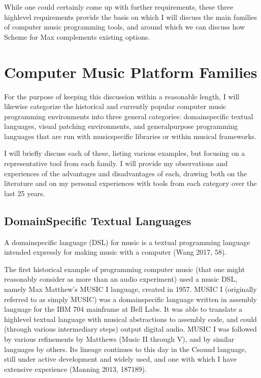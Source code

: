 \documentclass[letterpaper,10pt,english]{sphinxmanual}
\begin{document}
\sphinxAtStartPar
While one could certainly come up with further requirements, these three high\sphinxhyphen{}level
requirements provide the basis
on which I will discuss the main families of computer music programming tools, and
around which we can discuss how Scheme for Max complements existing options.


\section{Computer Music Platform Families}
\label{\detokenize{background:computer-music-platform-families}}
\sphinxAtStartPar
For the purpose of keeping this discussion within a reasonable length,
I will likewise categorize the historical and currently popular computer music programming
environments into three general categories: domain\sphinxhyphen{}specific textual languages, visual patching
environments, and general\sphinxhyphen{}purpose programming languages that are run with music\sphinxhyphen{}specific libraries
or within musical frameworks.

\sphinxAtStartPar
I will briefly discuss each of these, listing various examples, but focusing on a representative tool from each family.
I will provide my observations and experiences of the advantages and disadvantages of each,
drawing both on the literature and on my personal experiences with tools from each category
over the last 25 years.


\subsection{Domain\sphinxhyphen{}Specific Textual Languages}
\label{\detokenize{background:domain-specific-textual-languages}}
\sphinxAtStartPar
A domain\sphinxhyphen{}specific language (DSL) for music is a textual programming language intended
expressly for making music with a computer (Wang 2017, 58).

\sphinxAtStartPar
The first historical example of programming computer music (that one might reasonably
consider as more than an audio experiment) used a music DSL, namely Max Matthew’s MUSIC I
language, created in 1957.
MUSIC I (originally referred to as simply MUSIC) was a domain\sphinxhyphen{}specific language written in assembly
language for the IBM 704 mainframe at Bell Labs.
It was able to translate a high\sphinxhyphen{}level textual language with musical abstractions to assembly code,
and could (through various intermediary steps) output digital audio.
MUSIC I was followed by various refinements by Matthews (Music II through V),
and by similar languages by others.
Its lineage continues to this day in the Csound language, still under active development and widely used,
and one with which I have extensive experience (Manning 2013, 187\sphinxhyphen{}189).
\end{document}
